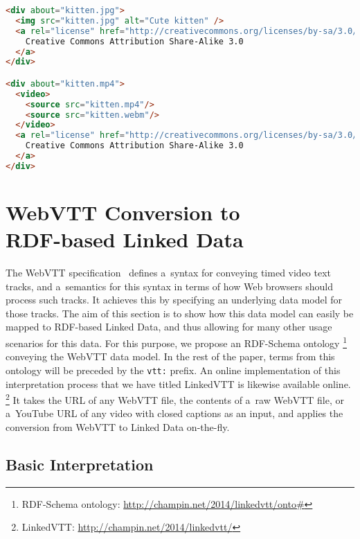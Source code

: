 \documentclass{sig-alternate-ceur}
\newcommand{\inlinelistingsize}{\fontsize{8pt}{11pt}}
\let\oldurl\url
\renewcommand{\url}[1]{\inlinelistingsize\oldurl{#1}}
\newcommand{\vtt}[1]{\texttt{vtt:#1}}
\begin{document}
\begin{lstlisting}[caption={Specifying a~license for an image and attempt to do the same for a~video with two sources (the license of kitten.webm stays unclear)},
  label=listing:html-license, language=html, float=h!]
<div about="kitten.jpg">
  <img src="kitten.jpg" alt="Cute kitten" />
  <a rel="license" href="http://creativecommons.org/licenses/by-sa/3.0/">
    Creative Commons Attribution Share-Alike 3.0
  </a>
</div>

<div about="kitten.mp4">
  <video>
    <source src="kitten.mp4"/>
    <source src="kitten.webm"/>
  </video>  
  <a rel="license" href="http://creativecommons.org/licenses/by-sa/3.0/">
    Creative Commons Attribution Share-Alike 3.0
  </a>
</div>
\end{lstlisting}

\section{WebVTT Conversion to\\ RDF-based Linked Data}
\label{sec:webvtt-conversion-to-rdf-based-linked-data}

The WebVTT specification~\cite{pfeiffer2013webvtt} defines a~syntax
for conveying timed video text tracks,
and a~semantics for this syntax in terms of how
Web browsers should process such tracks.
It achieves this by specifying an underlying data model for those tracks.
The aim of this section is to show
how this data model can easily be mapped to RDF-based Linked Data,
and thus allowing for many other usage scenarios for this data.
For this purpose, we propose an RDF-Schema ontology%
\footnote{RDF-Schema ontology:
\url{http://champin.net/2014/linkedvtt/onto\#}}
conveying the WebVTT data model.
In the rest of the paper, terms from this ontology
will be preceded by the \vtt{} prefix.
An online implementation of this interpretation process
that we have titled LinkedVTT is likewise available online.%
\footnote{LinkedVTT: \url{http://champin.net/2014/linkedvtt/}}
It takes the URL of any WebVTT file, the contents of a~raw WebVTT file,
or a~YouTube URL of any video with closed captions as an input,
and applies the conversion from WebVTT to Linked Data on-the-fly.

\subsection{Basic Interpretation}
\end{document}
